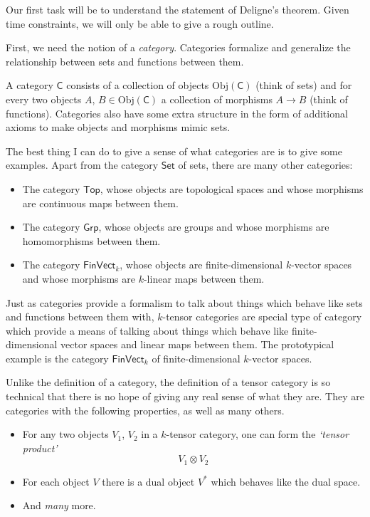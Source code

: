 \documentclass[a4paper]{report}
\newcommand{\Obj}{\mathrm{Obj}}
\theoremstyle{definition}
\theoremstyle{plain}
\theoremstyle{remark}
\begin{document}
Our first task will be to understand the statement of Deligne's theorem. Given time constraints, we will only be able to give a rough outline.

First, we need the notion of a \emph{category}. Categories formalize and generalize the relationship between sets and functions between them.

A category $\mathsf{C}$ consists of a collection of objects $\Obj(\mathsf{C})$ (think of sets) and for every two objects $A$, $B \in \Obj(\mathsf{C})$ a collection of morphisms $A \to B$ (think of functions). Categories also have some extra structure in the form of additional axioms to make objects and morphisms mimic sets. 

The best thing I can do to give a sense of what categories are is to give some examples. Apart from the category $\mathsf{Set}$ of sets, there are many other categories:
\begin{itemize}
  \item The category $\mathsf{Top}$, whose objects are topological spaces and whose morphisms are continuous maps between them.

  \item The category $\mathsf{Grp}$, whose objects are groups and whose morphisms are homomorphisms between them.

  \item The category $\mathsf{FinVect}_{k}$, whose objects are finite-dimensional $k$-vector spaces and whose morphisms are $k$-linear maps between them.
\end{itemize}

Just as categories provide a formalism to talk about things which behave like sets and functions between them with, $k$-tensor categories are special type of category which provide a means of talking about things which behave like finite-dimensional vector spaces and linear maps between them. The prototypical example is the category $\mathsf{FinVect}_{k}$ of finite-dimensional $k$-vector spaces.

Unlike the definition of a category, the definition of a tensor category is so technical that there is no hope of giving any real sense of what they are. They are categories with the following properties, as well as many others.
\begin{itemize}
  \item For any two objects $V_{1}$, $V_{2}$ in a $k$-tensor category, one can form the \emph{`tensor product'}
    \begin{equation*}
      V_{1} \otimes V_{2}
    \end{equation*}

  \item For each object $V$ there is a dual object $V^{*}$ which behaves like the dual space.

  \item And \emph{many} more. 
\end{itemize}
\end{document}
